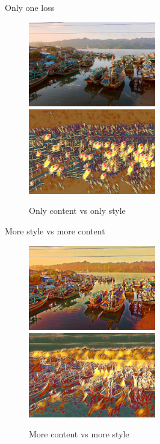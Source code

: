 \documentclass{beamer}
\begin{document}
    \begin{frame}{Only one loss}

        \begin{figure}
            \includegraphics[width=0.495\textwidth]{nostyle}
            \hfill
            \includegraphics[width=0.495\textwidth]{nocontent}
            \caption{\label{fig:clutter}Only content vs only style}
        \end{figure}

    \end{frame}

    \begin{frame}{More style vs more content}

        \begin{figure}
            \includegraphics[width=0.495\textwidth]{morecontent}
            \hfill
            \includegraphics[width=0.495\textwidth]{morestyle}
            \caption{\label{fig:clutter}More content vs more style}
        \end{figure}

    \end{frame}
\end{document}
